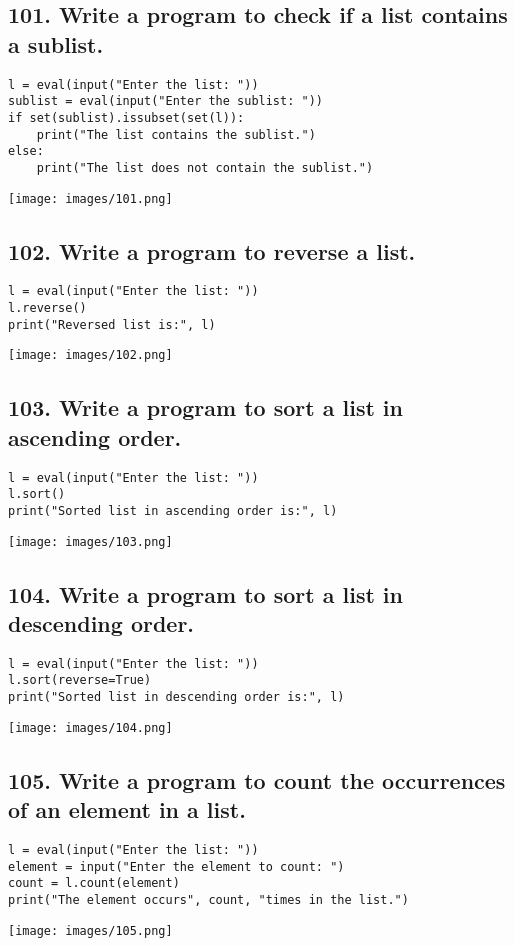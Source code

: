\documentclass[12pt]{article}
\begin{document}
\subsection*{101. Write a program to check if a list contains a sublist.}
\begin{verbatim}
l = eval(input("Enter the list: "))
sublist = eval(input("Enter the sublist: "))
if set(sublist).issubset(set(l)):
    print("The list contains the sublist.")
else:
    print("The list does not contain the sublist.")
\end{verbatim}
\texttt{[image: images/101.png]}

\subsection*{102. Write a program to reverse a list.}
\begin{verbatim}
l = eval(input("Enter the list: "))
l.reverse()
print("Reversed list is:", l)
\end{verbatim}
\texttt{[image: images/102.png]}

\subsection*{103. Write a program to sort a list in ascending order.}
\begin{verbatim}
l = eval(input("Enter the list: "))
l.sort()
print("Sorted list in ascending order is:", l)
\end{verbatim}
\texttt{[image: images/103.png]}

\subsection*{104. Write a program to sort a list in descending order.}
\begin{verbatim}
l = eval(input("Enter the list: "))
l.sort(reverse=True)
print("Sorted list in descending order is:", l)
\end{verbatim}
\texttt{[image: images/104.png]}

\subsection*{105. Write a program to count the occurrences of an element in a list.}
\begin{verbatim}
l = eval(input("Enter the list: "))
element = input("Enter the element to count: ")
count = l.count(element)
print("The element occurs", count, "times in the list.")
\end{verbatim}
\texttt{[image: images/105.png]}
\end{document}

